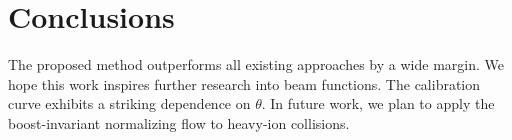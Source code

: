 \section{Conclusions}\label{sec:conclusions}

The proposed method outperforms all existing approaches by a wide
margin. We hope this work inspires further research into beam functions.
The calibration curve exhibits a striking dependence on $\theta$. In
future work, we plan to apply the boost-invariant normalizing flow to
heavy-ion collisions.

